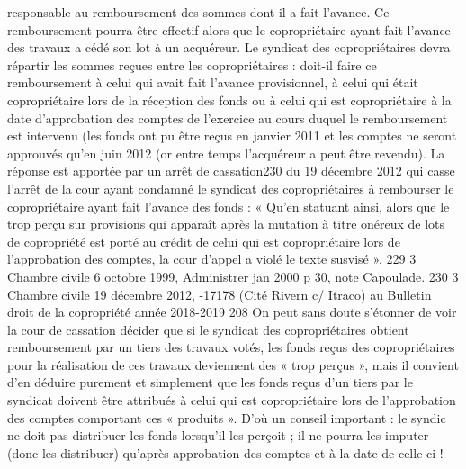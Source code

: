 	responsable au remboursement des sommes dont il a fait l’avance. Ce remboursement pourra être effectif
	alors que le copropriétaire ayant fait l’avance des travaux a cédé son lot à un acquéreur. Le syndicat des
	copropriétaires devra répartir les sommes reçues entre les copropriétaires : doit-il faire ce
	remboursement à celui qui avait fait l’avance provisionnel, à celui qui était copropriétaire lors de la
	réception des fonds ou à celui qui est copropriétaire à la date d’approbation des comptes de l’exercice au
	cours duquel le remboursement est intervenu (les fonds ont pu être reçus en janvier 2011 et les comptes
	ne seront approuvés qu’en juin 2012 (or entre temps l’acquéreur a peut être revendu).
	La réponse est apportée par un arrêt de cassation230 du 19 décembre 2012 qui casse l’arrêt de la cour
	ayant condamné le syndicat des copropriétaires à rembourser le copropriétaire ayant fait l’avance des
	fonds : « Qu’en statuant ainsi, alors que le trop perçu sur provisions qui apparaît après la mutation à titre
	onéreux de lots de copropriété est porté au crédit de celui qui est copropriétaire lors de l’approbation des
	comptes, la cour d’appel a violé le texte susvisé ».
	229 3\ieme{} Chambre civile 6 octobre 1999, Administrer jan 2000 p 30, note Capoulade.
	230 3\ieme{} Chambre civile 19 décembre 2012, -17178 (Cité Rivern c/ Itraco) au Bulletin
	droit de la copropriété année 2018-2019
	208
	On peut sans doute s’étonner de voir la cour de cassation décider que si le syndicat des
	copropriétaires obtient remboursement par un tiers des travaux votés, les fonds reçus des copropriétaires
	pour la réalisation de ces travaux deviennent des « trop perçus », mais il convient d’en déduire purement
	et simplement que les fonds reçus d’un tiers par le syndicat doivent être attribués à celui qui est
	copropriétaire lors de l’approbation des comptes comportant ces « produits ». D’où un conseil important :
	le syndic ne doit pas distribuer les fonds lorsqu’il les perçoit ; il ne pourra les imputer (donc les distribuer)
	qu’après approbation des comptes et à la date de celle-ci !